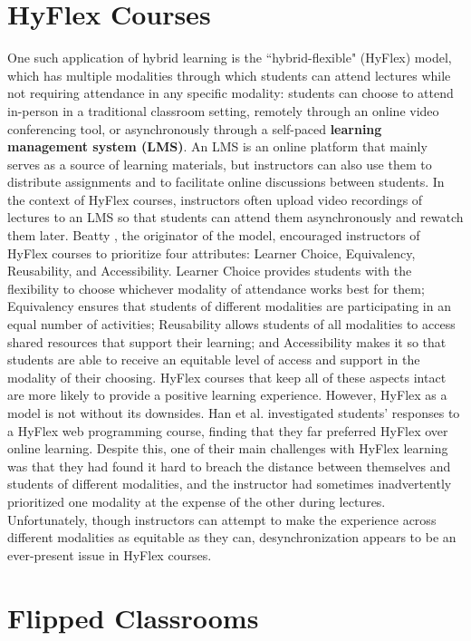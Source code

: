\section{HyFlex Courses}

One such application of hybrid learning is the ``hybrid-flexible" (HyFlex) model, which has multiple modalities through which students can attend lectures while not requiring attendance in any specific modality: students can choose to attend in-person in a traditional classroom setting, remotely through an online video conferencing tool, or asynchronously through a self-paced \textbf{learning management system (LMS)}. An LMS is an online platform that mainly serves as a source of learning materials, but instructors can also use them to distribute assignments and to facilitate online discussions between students. In the context of HyFlex courses, instructors often upload video recordings of lectures to an LMS so that students can attend them asynchronously and rewatch them later. Beatty \cite{beatty2014hybrid}, the originator of the model, encouraged instructors of HyFlex courses to prioritize four attributes: Learner Choice, Equivalency, Reusability, and Accessibility. Learner Choice provides students with the flexibility to choose whichever modality of attendance works best for them; Equivalency ensures that students of different modalities are participating in an equal number of activities; Reusability allows students of all modalities to access shared resources that support their learning; and Accessibility makes it so that students are able to receive an equitable level of access and support in the modality of their choosing. HyFlex courses that keep all of these aspects intact are more likely to provide a positive learning experience. However, HyFlex as a model is not without its downsides. Han et al. \cite{han2022students} investigated students' responses to a HyFlex web programming course, finding that they far preferred HyFlex over online learning. Despite this, one of their main challenges with HyFlex learning was that they had found it hard to breach the distance between themselves and students of different modalities, and the instructor had sometimes inadvertently prioritized one modality at the expense of the other during lectures. Unfortunately, though instructors can attempt to make the experience across different modalities as equitable as they can, desynchronization appears to be an ever-present issue in HyFlex courses.

\section{Flipped Classrooms}

